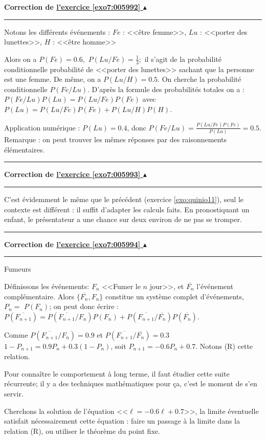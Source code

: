 \documentclass[11pt,a4paper]{article}
\newcommand{\finexercice}{}
\newcommand{\noindication}{}
\newcounter{exo}
\newcommand{\correction}[1]{\hypertarget{cor7:#1}{}\label{cor7:#1}{\bf Correction de \hyperlink{exo7:#1}{l'exercice \ref{exo7:#1} $\blacktriangle$}}\vspace{1mm}\hrule\vspace{1mm}}
\newcommand{\fincorrection}{\vspace{1mm}\hrule\vspace*{7mm}}
\newcommand{\finenonces}{\newpage}
\newcommand{\finindications}{\newpage}
\begin{document}
\finexercice

\finfiche

 \finenonces 



 \finindications 

\noindication
\noindication
\noindication
\noindication
\noindication
\noindication
\noindication
\noindication
\noindication
\noindication
\noindication
\noindication
\noindication


\newpage

\correction{005992}
Notons les différents événements :
$Fe$ : <<être femme>>, $Lu$ : <<porter des lunettes>>, $H$ : <<être homme>>

Alors on a $P(Fe)=0.6,$ $P(Lu/Fe)=\frac{1}{3};$ il s'agit de la 
probabilité conditionnelle probabilité de 
<<porter des lunettes>> sachant que la personne est une femme.
De même, on a $P(Lu/H)=0.5$. On cherche la probabilité
conditionnelle $P(Fe/Lu)$.
D'après la formule des probabilités totales on a :
$P(Fe/Lu)P(Lu)=P(Lu/Fe)P(Fe)$ avec $P(Lu)=P(Lu/Fe)P(Fe)+P(Lu/H)P(H)$.

Application numérique : $P(Lu)=0.4$, donc  $P(Fe/Lu)=\frac{P(Lu/Fe)P(Fe)}{P(Lu)}=0.5$.
Remarque : on peut trouver les mêmes réponses par des raisonnements 
élémentaires.
\fincorrection
\correction{005993}
C'est évidemment le même que le précédent (exercice \ref{exo:quinio11}), seul le contexte
est différent : il suffit d'adapter les calculs faits.
En pronostiquant un enfant, le présentateur a une chance sur deux
environ de ne pas se tromper.
\fincorrection
\correction{005994}
Fumeurs

Définissons les événements: $F_{n}$ <<Fumer le $n$ jour>>, et $\overline{F_{n}}$ 
l'événement complémentaire.
Alors $\{\overline{F_{n}},F_{n}\}$ constitue un système complet d'événements, 
$P_{n}=$ $P(F_{n})$; on peut donc écrire :
$P(\overline{F_{n+1}})=P(\overline{F_{n+1}}/F_{n})P(F_{n})
+P(\overline{F_{n+1}}/\overline{F_{n}})P(\overline{F_{n}})$.

Comme $P(\overline{F_{n+1}}/F_{n})=0.9$ et $P(\overline{F_{n+1}}/\overline{F_{n}})=0.3$
$1-P_{n+1}=0.9P_{n}+0.3(1-P_{n})$, soit $P_{n+1}=-0.6P_{n}+0.7$. Notons (R)
cette relation.

Pour connaître le comportement à long terme, il faut étudier cette
suite récurrente; il y a des techniques mathématiques pour ça,
c'est le moment de s'en servir.

Cherchons la solution de l'équation <<$\ell=-0.6\ell+0.7$>>, 
la limite éventuelle satisfait nécessairement cette équation : faire un passage à la limite dans la
relation (R), ou utiliser le théorème du point fixe.
\end{document}
